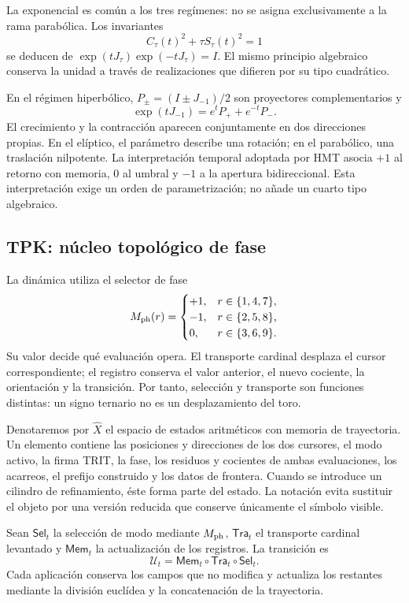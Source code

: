 La exponencial es común a los tres regímenes: no se asigna exclusivamente a la rama parabólica. Los invariantes
\[
 C_\tau(t)^2+\tau S_\tau(t)^2=1
\]
se deducen de \(\exp(tJ_\tau)\exp(-tJ_\tau)=I\). El mismo principio algebraico conserva la unidad a través de realizaciones que difieren por su tipo cuadrático.

En el régimen hiperbólico, \(P_\pm=(I\pm J_{-1})/2\) son proyectores complementarios y
\[
 \exp(tJ_{-1})=e^tP_++e^{-t}P_-.
\]
El crecimiento y la contracción aparecen conjuntamente en dos direcciones propias. En el elíptico, el parámetro describe una rotación; en el parabólico, una traslación nilpotente. La interpretación temporal adoptada por HMT asocia \(+1\) al retorno con memoria, \(0\) al umbral y \(-1\) a la apertura bidireccional. Esta interpretación exige un orden de parametrización; no añade un cuarto tipo algebraico.





\subsection{TPK: núcleo topológico de fase}

La dinámica utiliza el selector de fase
\[
 M_{\rm ph}(r)=
 \begin{cases}
 +1,&r\in\{1,4,7\},\\
 -1,&r\in\{2,5,8\},\\
 0,&r\in\{3,6,9\}.
 \end{cases}
\]
Su valor decide qué evaluación opera. El transporte cardinal desplaza el cursor correspondiente; el registro conserva el valor anterior, el nuevo cociente, la orientación y la transición. Por tanto, selección y transporte son funciones distintas: un signo ternario no es un desplazamiento del toro.

Denotaremos por \(\widehat X\) el espacio de estados aritméticos con memoria de trayectoria. Un elemento contiene las posiciones y direcciones de los dos cursores, el modo activo, la firma TRIT, la fase, los residuos y cocientes de ambas evaluaciones, los acarreos, el prefijo construido y los datos de frontera. Cuando se introduce un cilindro de refinamiento, éste forma parte del estado. La notación evita sustituir el objeto por una versión reducida que conserve únicamente el símbolo visible.

\begin{definition}
Sean \(\mathsf{Sel}_t\) la selección de modo mediante \(M_{\rm ph}\), \(\mathsf{Tra}_t\) el transporte cardinal levantado y \(\mathsf{Mem}_t\) la actualización de los registros. La transición es
\begin{equation}
 \mathcal U_t=\mathsf{Mem}_t\circ\mathsf{Tra}_t\circ\mathsf{Sel}_t.
 \label{eq:actualizacion}
\end{equation}
Cada aplicación conserva los campos que no modifica y actualiza los restantes mediante la división euclídea y la concatenación de la trayectoria.
\end{definition}

